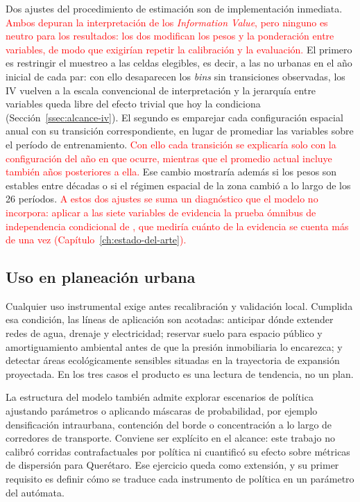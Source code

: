 Dos ajustes del procedimiento de estimación son de implementación inmediata. \textcolor{red}{Ambos depuran la interpretación de los \textit{Information Value}, pero ninguno es neutro para los resultados: los dos modifican los pesos y la ponderación entre variables, de modo que exigirían repetir la calibración y la evaluación.} El primero es restringir el muestreo a las celdas elegibles, es decir, a las no urbanas en el año inicial de cada par: con ello desaparecen los \textit{bins} sin transiciones observadas, los IV vuelven a la escala convencional de interpretación y la jerarquía entre variables queda libre del efecto trivial que hoy la condiciona (Sección~\ref{ssec:alcance-iv}). El segundo es emparejar cada configuración espacial anual con su transición correspondiente, en lugar de promediar las variables sobre el período de entrenamiento. \textcolor{red}{Con ello cada transición se explicaría solo con la configuración del año en que ocurre, mientras que el promedio actual incluye también años posteriores a ella.} Ese cambio mostraría además si los pesos son estables entre décadas o si el régimen espacial de la zona cambió a lo largo de los 26 períodos. \textcolor{red}{A estos dos ajustes se suma un diagnóstico que el modelo no incorpora: aplicar a las siete variables de evidencia la prueba ómnibus de independencia condicional de \textcite{BonhamCarter1994}, que mediría cuánto de la evidencia se cuenta más de una vez (Capítulo~\ref{ch:estado-del-arte}).}

\subsection{Uso en planeación urbana}

Cualquier uso instrumental exige antes recalibración y validación local. Cumplida esa condición, las líneas de aplicación son acotadas: anticipar dónde extender redes de agua, drenaje y electricidad; reservar suelo para espacio público y amortiguamiento ambiental antes de que la presión inmobiliaria lo encarezca; y detectar áreas ecológicamente sensibles situadas en la trayectoria de expansión proyectada. En los tres casos el producto es una lectura de tendencia, no un plan.

La estructura del modelo también admite explorar escenarios de política ajustando parámetros o aplicando máscaras de probabilidad, por ejemplo densificación intraurbana, contención del borde o concentración a lo largo de corredores de transporte. Conviene ser explícito en el alcance: este trabajo no calibró corridas contrafactuales por política ni cuantificó su efecto sobre métricas de dispersión para Querétaro. Ese ejercicio queda como extensión, y su primer requisito es definir cómo se traduce cada instrumento de política en un parámetro del autómata.

